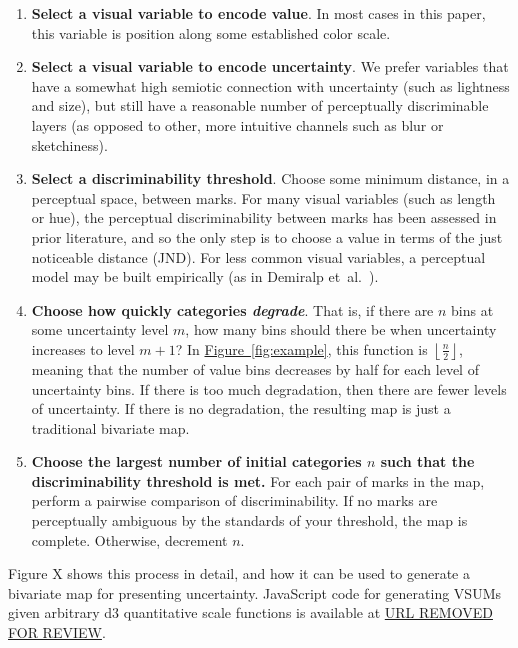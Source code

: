 \documentclass{vgtc}                          %
\newcommand{\figref}[1]{\hyperref[#1]{Figure~\ref*{#1}}}
\newcommand{\ea}{{et~al.}\xspace}
\begin{document}
\begin{enumerate}
	\item \textbf{Select a visual variable to encode value}. In most cases in this paper, this variable is position along some established color scale.
	\item \textbf{Select a visual variable to encode uncertainty}. We prefer variables that have a somewhat high semiotic connection with uncertainty (such as lightness and size), but still have a reasonable number of perceptually discriminable layers (as opposed to other, more intuitive channels such as blur or sketchiness).
	\item \textbf{Select a discriminability threshold}. Choose some minimum distance, in a perceptual space, between marks. For many visual variables (such as length or hue), the perceptual discriminability between marks has been assessed in prior literature, and so the only step is to choose a value in terms of the just noticeable distance (JND). For less common visual variables, a perceptual model may be built empirically (as in Demiralp \ea~\cite{demiralp2014learning}).
	\item \textbf{Choose how quickly categories \emph{degrade}}. That is, if there are $n$ bins at some uncertainty level $m$, how many bins should there be when uncertainty increases to level $m+1$? In \figref{fig:example}, this function is $\left \lfloor {\frac{n}{2}}\right \rfloor$, meaning that the number of value bins decreases by half for each level of uncertainty bins. If there is too much degradation, then there are fewer levels of uncertainty. If there is no degradation, the resulting map is just a traditional bivariate map.
	\item \textbf{Choose the largest number of initial categories $n$ such that the discriminability threshold is met.} For each pair of marks in the map, perform a pairwise comparison of discriminability. If no marks are perceptually ambiguous by the standards of your threshold, the map is complete. Otherwise, decrement $n$.
\end{enumerate}

Figure X shows this process in detail, and how it can be used to generate a bivariate map for presenting uncertainty. JavaScript code for generating VSUMs given arbitrary d3 quantitative scale functions is available at \url{URL REMOVED FOR REVIEW}.
\end{document}
